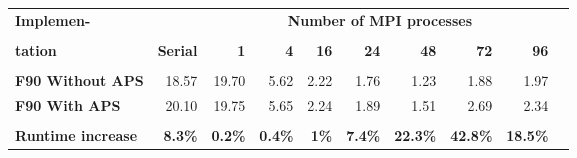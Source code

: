 \begin{tabular}{lrrrrrrrrr}\toprule
\textbf{Implemen-} & &\multicolumn{7}{c}{\textbf{Number of MPI processes}} \\
\cline{3-9}\vspace{-10pt} &\textbf{} &\textbf{} &\textbf{} &\textbf{} &\textbf{} &\textbf{} &\textbf{} &\textbf{} \\
\textbf{tation} &\textbf{Serial} &\textbf{1} &\textbf{4} &\textbf{16} &\textbf{24} &\textbf{48} &\textbf{72} &\textbf{96} \\
\midrule[0.1pt]\vspace{-10pt} & & & & & & & & \\
\textbf{F90 Without APS} &18.57 &19.70 &5.62 &2.22 &1.76 &1.23 &1.88 &1.97 \\
\textbf{F90 With APS} &20.10 &19.75 &5.65 &2.24 &1.89 &1.51 &2.69 &2.34 \\
\midrule[0.1pt]\vspace{-10pt} & & & & & & & & \\
\textbf{Runtime increase} &\textbf{8.3\%} &\textbf{0.2\%} &\textbf{0.4\%} &\textbf{1\%} &\textbf{7.4\%} &\textbf{22.3\%} &\textbf{42.8\%} &\textbf{18.5\%} \\
\bottomrule
\end{tabular}